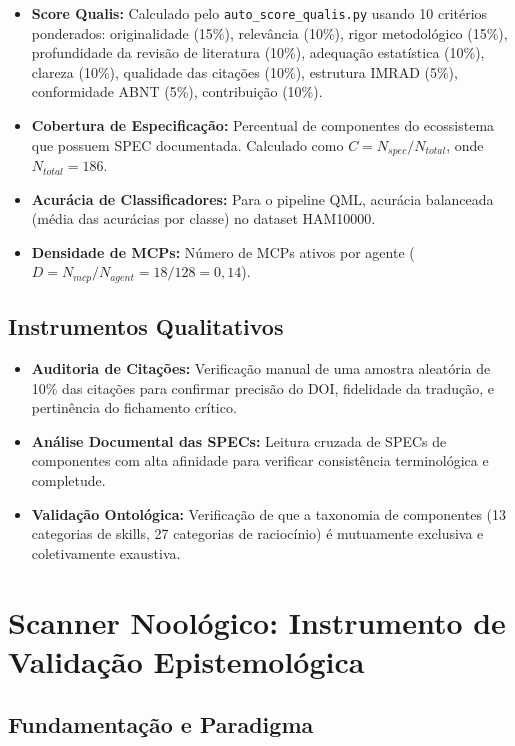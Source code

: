 \begin{itemize}
  \item \textbf{Score Qualis:} Calculado pelo \texttt{auto\_score\_qualis.py} usando 10 critérios ponderados: originalidade (15\%), relevância (10\%), rigor metodológico (15\%), profundidade da revisão de literatura (10\%), adequação estatística (10\%), clareza (10\%), qualidade das citações (10\%), estrutura IMRAD (5\%), conformidade ABNT (5\%), contribuição (10\%).
  \item \textbf{Cobertura de Especificação:} Percentual de componentes do ecossistema que possuem SPEC documentada. Calculado como $C = N_{spec} / N_{total}$, onde $N_{total} = 186$.
  \item \textbf{Acurácia de Classificadores:} Para o pipeline QML, acurácia balanceada (média das acurácias por classe) no dataset HAM10000.
  \item \textbf{Densidade de MCPs:} Número de MCPs ativos por agente ($D = N_{mcp} / N_{agent} = 18/128 = 0,14$).
\end{itemize}

\subsection{Instrumentos Qualitativos}

\begin{itemize}
  \item \textbf{Auditoria de Citações:} Verificação manual de uma amostra aleatória de 10\% das citações para confirmar precisão do DOI, fidelidade da tradução, e pertinência do fichamento crítico.
  \item \textbf{Análise Documental das SPECs:} Leitura cruzada de SPECs de componentes com alta afinidade para verificar consistência terminológica e completude.
  \item \textbf{Validação Ontológica:} Verificação de que a taxonomia de componentes (13 categorias de skills, 27 categorias de raciocínio) é mutuamente exclusiva e coletivamente exaustiva.
\end{itemize}

\section{Scanner Noológico: Instrumento de Validação Epistemológica}

\subsection{Fundamentação e Paradigma}

